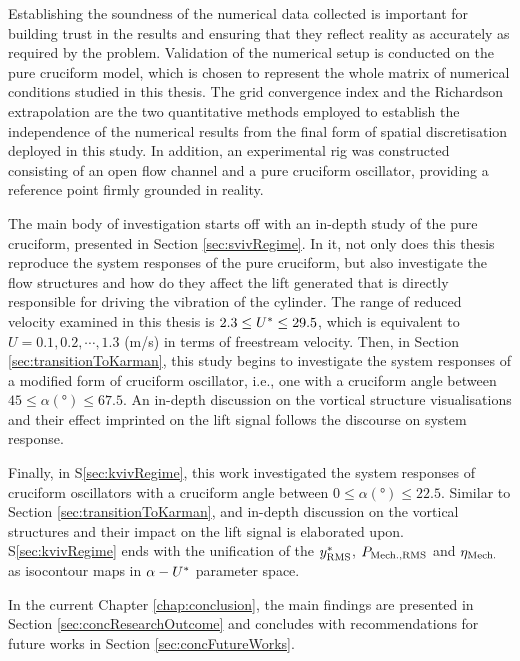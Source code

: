 \documentclass[oneside]{utmthesis}
\begin{document}
Establishing the soundness of the numerical data collected is important for building trust in the results and ensuring that they reflect reality as accurately as required by the problem. Validation of the numerical setup is conducted on the pure cruciform model, which is chosen to represent the whole matrix of numerical conditions studied in this thesis. The grid convergence index and the Richardson extrapolation are the two quantitative methods employed to establish the independence of the numerical results from the final form of spatial discretisation deployed in this study. In addition, an experimental rig was constructed consisting of an open flow channel and a pure cruciform oscillator, providing a reference point firmly grounded in reality.

The main body of investigation starts off with an in-depth study of the pure cruciform, presented in Section \ref{sec:svivRegime}. In it, not only does this thesis reproduce the system responses of the pure cruciform, but also investigate the flow structures and how do they affect the lift generated that is directly responsible for driving the vibration of the cylinder. The range of reduced velocity examined in this thesis is $2.3 \leq U^{*} \leq 29.5$, which is equivalent to $U = 0.1, 0.2, \cdots, 1.3$ (m/s) in terms of freestream velocity. Then, in Section \ref{sec:transitionToKarman}, this study begins to investigate the system responses of a modified form of cruciform oscillator, i.e., one with a cruciform angle between $45 \leq \alpha (\si{\degree}) \leq 67.5$. An in-depth discussion on the vortical structure visualisations and their effect imprinted on the lift signal follows the discourse on system response.

Finally, in S\ref{sec:kvivRegime}, this work investigated the system responses of cruciform oscillators with a cruciform angle between $0 \leq \alpha (\si{\degree}) \leq 22.5$. Similar to Section \ref{sec:transitionToKarman}, and in-depth discussion on the vortical structures and their impact on the lift signal is elaborated upon. S\ref{sec:kvivRegime} ends with the unification of the $y^{*}_{\text{RMS}}$, $P_{\text{Mech.,RMS}}$ and $\eta_{\text{Mech.}}$ as isocontour maps in $\alpha - U^{*}$ parameter space.

In the current Chapter \ref{chap:conclusion}, the main findings are presented in Section \ref{sec:concResearchOutcome} and concludes with recommendations for future works in Section \ref{sec:concFutureWorks}.
\end{document}
